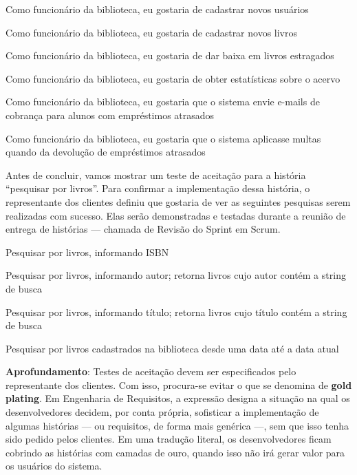 \documentclass[
  11pt,
  twoside]{book}
\renewenvironment{quote}{\centering \vspace{1.5ex} \begin{tcolorbox}[colback=backcolor, width=4.9in]}{\end{tcolorbox}}
\newenvironment{esmbox}{\centering \vspace{1.5ex} \begin{tcolorbox}[breakable, colback=backcolor, width=4.9in]}{\end{tcolorbox} \vspace{1.5ex}}
\begin{document}
\begin{quote}
Como funcionário da biblioteca, eu gostaria de cadastrar novos usuários

Como funcionário da biblioteca, eu gostaria de cadastrar novos livros
\end{quote}

\begin{quote}
Como funcionário da biblioteca, eu gostaria de dar baixa em livros
estragados

Como funcionário da biblioteca, eu gostaria de obter estatísticas sobre
o acervo

Como funcionário da biblioteca, eu gostaria que o sistema envie e-mails
de cobrança para alunos com empréstimos atrasados

Como funcionário da biblioteca, eu gostaria que o sistema aplicasse
multas quando da devolução de empréstimos atrasados
\end{quote}

Antes de concluir, vamos mostrar um teste de aceitação para a história
``pesquisar por livros''. Para confirmar a implementação dessa história,
o representante dos clientes definiu que gostaria de ver as seguintes
pesquisas serem realizadas com sucesso. Elas serão demonstradas e
testadas durante a reunião de entrega de histórias --- chamada de
Revisão do Sprint em Scrum.

\begin{quote}
Pesquisar por livros, informando ISBN

Pesquisar por livros, informando autor; retorna livros cujo autor contém
a string de busca

Pesquisar por livros, informando título; retorna livros cujo título
contém a string de busca

Pesquisar por livros cadastrados na biblioteca desde uma data até a data
atual
\end{quote}


\begin{esmbox}

\textbf{Aprofundamento}: Testes de aceitação devem ser especificados
pelo representante dos clientes. Com isso, procura-se evitar o que se
denomina de \textbf{gold plating}. Em Engenharia de Requisitos, a
expressão designa a situação na qual os desenvolvedores decidem, por
conta própria, sofisticar a implementação de algumas histórias --- ou
requisitos, de forma mais genérica ---, sem que isso tenha sido pedido
pelos clientes. Em uma tradução literal, os desenvolvedores ficam
cobrindo as histórias com camadas de ouro, quando isso não irá gerar
valor para os usuários do sistema.

\end{esmbox}
\end{document}
